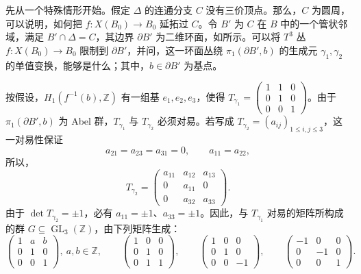 先从一个特殊情形开始。假定 $\Delta$ 的连通分支 $C$ 没有三价顶点。那么，$C$ 为圆周，可以说明，如何把 $f\colon X(B_0)\to B_0$ 延拓过 $C$。令 $B'$ 为 $C$ 在 $B$ 中的一个管状邻域，满足 $B'\cap\Delta=C$，其边界 $\partial B'$ 为二维环面，如所示。可以将 $T^3$ 丛 $f\colon X(B_0)\to B_0$ 限制到 $\partial B'$，并问，这一环面丛绕 $\pi_1(\partial B',b)$ 的生成元 $\gamma_1,\gamma_2$ 的单值变换，能够是什么；其中，$b\in\partial B'$ 为基点。
\begin{figure}[H]
\centering
{}
\BookNumberOnlyCaption\label{fig:6.11}
\end{figure}
按假设，$H_1(f^{-1}(b),\mathbb Z)$ 有一组基 $e_1,e_2,e_3$，使得 $T_{\gamma_1}=\begin{pmatrix}1&1&0\\0&1&0\\0&0&1\end{pmatrix}$。由于 $\pi_1(\partial B',b)$ 为 Abel 群，$T_{\gamma_1}$ 与 $T_{\gamma_2}$ 必须对易。若写成 $T_{\gamma_2}=(a_{ij})_{1\leq i,j\leq3}$，这一对易性保证
\[
a_{21}=a_{23}=a_{31}=0,\qquad a_{11}=a_{22},
\]
所以，
\[
T_{\gamma_2}=\begin{pmatrix}a_{11}&a_{12}&a_{13}\\0&a_{11}&0\\0&a_{32}&a_{33}\end{pmatrix}.
\]
由于 $\det T_{\gamma_2}=\pm1$，必有 $a_{11}=\pm1$、$a_{33}=\pm1$。因此，与 $T_{\gamma_1}$ 对易的矩阵所构成的群 $G\subseteq\operatorname{GL}_3(\mathbb Z)$，由下列矩阵生成：
\[
\begin{pmatrix}1&a&b\\0&1&0\\0&0&1\end{pmatrix},\ a,b\in\mathbb Z,\qquad
\begin{pmatrix}1&0&0\\0&1&0\\0&1&1\end{pmatrix},\qquad
\begin{pmatrix}1&0&0\\0&1&0\\0&0&-1\end{pmatrix},\qquad
\begin{pmatrix}-1&0&0\\0&-1&0\\0&0&1\end{pmatrix}.
\]

